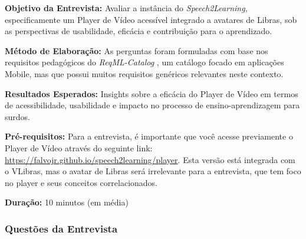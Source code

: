 \noindent
\textbf{Objetivo da Entrevista:} Avaliar a instância do \textit{Speech2Learning}, especificamente um Player de Vídeo acessível integrado a avatares de Libras, sob as perspectivas de usabilidade, eficácia e contribuição para o aprendizado.

\noindent
\textbf{Método de Elaboração:} As perguntas foram formuladas com base nos requisitos pedagógicos do \textit{ReqML-Catalog} \cite{Soad2017_FIE}, um catálogo focado em aplicações Mobile, mas que possui muitos requisitos genéricos relevantes neste contexto.

\noindent
\textbf{Resultados Esperados:} Insights sobre a eficácia do Player de Vídeo em termos de acessibilidade, usabilidade e impacto no processo de ensino-aprendizagem para surdos.

\noindent
\textbf{Pré-requisitos:} Para a entrevista, é importante que você acesse previamente o Player de Vídeo através do seguinte link: \url{https://falvojr.github.io/speech2learning/player}. Esta versão está integrada com o VLibras, mas o avatar de Libras será irrelevante para a entrevista, que tem foco no player e seus conceitos correlacionados.

\noindent
\textbf{Duração:} 10 minutos (em média)

\subsubsection*{Questões da Entrevista}

